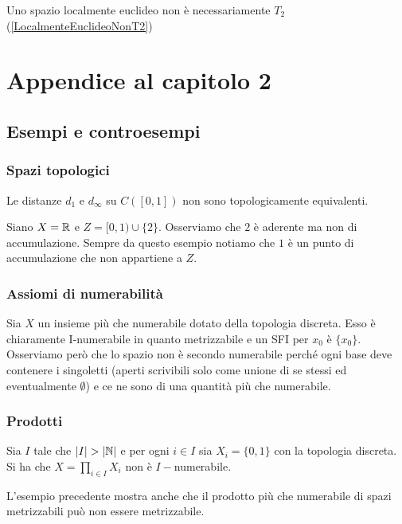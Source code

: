 \begin{multicols*}{2}
\begin{remark}
Uno spazio localmente euclideo non \`e necessariamente $T_2$ (\ref{LocalmenteEuclideoNonT2})
\end{remark}

\section{Appendice al capitolo 2}

\subsection{Esempi e controesempi}

\subsubsection{Spazi topologici}
\begin{example}\label{DistanzeNonTopEquivalenti}
Le distanze $d_1$ e $d_\infty$ su $C([0,1])$ non sono topologicamente equivalenti.
\end{example}


\begin{example}\label{AderenteNonAccumulazione}
Siano $X=\mathbb{R}$ e $Z=[0,1)\cup \{2\}$. Osserviamo che $2$ \`e aderente ma non di accumulazione. Sempre da questo esempio notiamo che $1$ \`e un punto di accumulazione che non appartiene a $Z$.
\end{example}

\subsubsection{Assiomi di numerabilit\`a}
\begin{example}\label{INumerabileNonIINumerabile}
Sia $X$ un insieme  pi\`u che numerabile dotato della topologia discreta. Esso \`e chiaramente I-numerabile in quanto metrizzabile e un SFI per $x_0$ \`e $\{x_0\}$. Osserviamo per\`o che lo spazio non \`e secondo numerabile perch\'e ogni base deve contenere i singoletti (aperti scrivibili solo come unione di se stessi ed eventualmente $\emptyset$) e ce ne sono di una quantit\`a pi\`u che numerabile.
\end{example}

\subsubsection{Prodotti}
\begin{example}\label{ProdottoDiINumerabileNonINumerabile}
Sia $I$ tale che $|I|>|\N|$ e per ogni $i\in I$ sia $X_i=\{0,1\}$ con la topologia discreta. Si ha che $X=\prod_{i\in I}X_i$ non \`e $I-$numerabile.
\end{example}
\begin{remark}
L'esempio precedente mostra anche che il prodotto pi\`u che numerabile di spazi metrizzabili pu\`o non essere metrizzabile.
\end{remark}



\end{multicols*}
